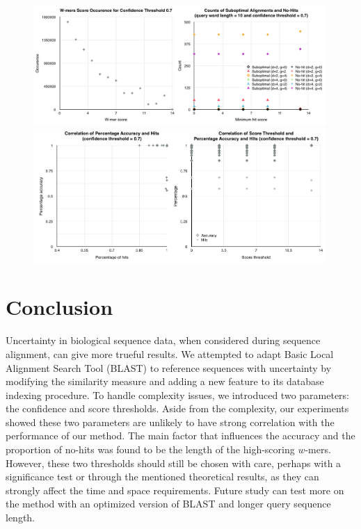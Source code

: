 \documentclass{article}
\begin{document}
\begin{figure}[tbp]
\begin{center}
\caption{}
  \includegraphics[width=0.99\textwidth]{true-10}
  \includegraphics[width=0.99\textwidth]{true-07}
\label{figure:true_result}
\end{center}
\end{figure}

\section{Conclusion}

Uncertainty in biological sequence data, when considered during sequence alignment, can give more trueful results. We attempted to adapt Basic Local Alignment Search Tool (BLAST) to reference sequences with uncertainty by modifying the similarity measure and adding a new feature to its database indexing procedure. To handle complexity issues, we introduced two parameters: the confidence and score thresholds. Aside from the complexity, our experiments showed these two parameters are unlikely to have strong correlation with the performance of our method. The main factor that influences the accuracy and the proportion of no-hits was found to be the length of the high-scoring $w$-mers. However, these two thresholds should still be chosen with care, perhaps with a significance test or through the mentioned theoretical results, as they can strongly affect the time and space requirements. Future study can test more on the method with an optimized version of BLAST and longer query sequence length. 
\end{document}
